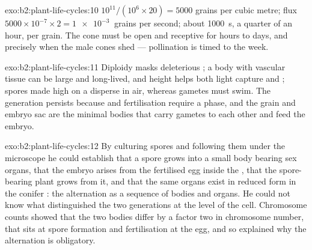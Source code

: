 \begin{solution}{exo:b2:plant-life-cycles:10}
$10^{11}/(10^{6}\times 20) = \num{5000}$ grains per cubic metre; flux
$5000\times 10^{-7}\times 2 = \qty{1e-3}{}$ grains per second; about
\qty{1000}{s}, a quarter of an hour, per grain. The cone must be open
and receptive for hours to days, and precisely when the male cones
shed --- pollination is timed to the week.
\end{solution}

\begin{solution}{exo:b2:plant-life-cycles:11}
Diploidy masks  deleterious ; a  body with
vascular tissue can be large and long-lived, and height helps both
light capture and ; spores made high on a 
disperse in air, whereas gametes must swim. The  generation
persists because  and fertilisation require a  phase,
and the  grain and embryo sac are the minimal bodies that
carry gametes to each other and feed the embryo.
\end{solution}

\begin{solution}{exo:b2:plant-life-cycles:12}
By culturing spores and following them under the microscope he could
establish that a spore grows into a small body bearing sex organs,
that the embryo arises from the fertilised egg inside the
, that the spore-bearing plant grows from it, and that
the same organs exist in reduced form in the conifer : the
alternation as a sequence of bodies and organs. He could not know
what distinguished the two generations at the level of the cell.
Chromosome counts showed that the two bodies differ by a factor two
in chromosome number, that  sits at spore formation and
fertilisation at the egg, and so explained why the alternation is
obligatory.
\end{solution}


